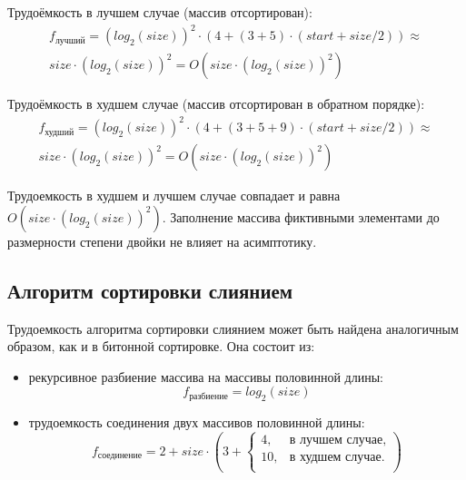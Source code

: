 Трудоёмкость в лучшем случае (массив отсортирован):
\begin{equation}
	\begin{multlined}
		f_{\text{лучший}} = (log_2{(size)})^2  \cdot (4 + (3 + 5) \cdot (start + size / 2)) \approx \\ size \cdot (log_2{(size)})^2 = O(size \cdot (log_2{(size)})^2)              
	\end{multlined}
\end{equation}

Трудоёмкость в худшем случае (массив отсортирован в обратном порядке):
\begin{equation}
	\begin{multlined}
		f_{\text{худший}} = (log_2{(size)})^2  \cdot (4 + (3 + 5 + 9) \cdot (start + size / 2)) \approx \\ size \cdot (log_2{(size)})^2 = O(size \cdot (log_2{(size)})^2)              
	\end{multlined}
\end{equation}

Трудоемкость в худшем и лучшем случае совпадает и равна $O(size \cdot (log_2{(size)})^2)$. Заполнение массива фиктивными элементами до размерности степени двойки не влияет на асимптотику.

\subsection{Алгоритм сортировки слиянием}

Трудоемкость алгоритма сортировки слиянием может быть найдена аналогичным образом, как и в битонной сортировке. Она состоит из:

\begin{itemize}
	\item рекурсивное разбиение массива на массивы половинной длины:
	\begin{equation}
		\label{worst_counting}
		f_{\text{разбиение}} = log_2{(size)}
	\end{equation}
	
	\item трудоемкость соединения двух массивов половинной длины:
	\begin{equation}
		\label{worst_counting}
		f_{\text{соединение}} = 2 + size \cdot (3 + \begin{cases}
			4, & \text{в лучшем случае},\\
			10, & \text{в худшем случае}.\\
		\end{cases})
	\end{equation}
\end{itemize}

